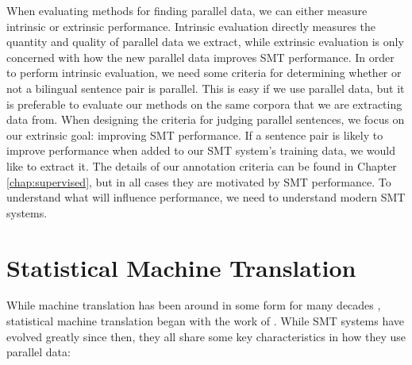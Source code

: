 When evaluating methods for finding parallel data, we can either measure
intrinsic or extrinsic performance. Intrinsic evaluation directly measures the
quantity and quality of parallel data we extract, while extrinsic evaluation is
only concerned with how the new parallel data improves SMT performance.
In order to perform intrinsic evaluation, we need some criteria for determining whether or not a bilingual
sentence pair is parallel. This is easy if we use parallel data, but
it is preferable to evaluate our methods on the same corpora that we are
extracting data from. When designing the criteria for judging parallel
sentences, we focus on our extrinsic goal: improving SMT performance. If a sentence pair
is likely to improve performance when added to our SMT system's training data,
we would like to extract it. The details of our annotation criteria can be found
in Chapter \ref{chap:supervised}, but in all cases they are motivated by SMT
performance. To understand what will influence performance, we need to
understand modern SMT systems.

\section{Statistical Machine Translation}
While machine translation has been around in some form for many decades
\citep{Locke55}, statistical machine translation began with the work of
\citet{Brown88,Brown90,Brown93}. While SMT systems have evolved greatly since
then, they all share some key characteristics in how they use parallel data:


